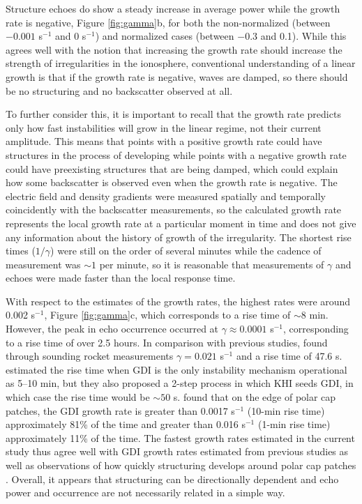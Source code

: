 Structure echoes do show a steady increase in average power while the growth rate is negative, Figure \ref{fig:gamma}b, for both the non-normalized (between \(-0.001\) s\(^{-1}\) and 0  s\(^{-1}\)) and normalized cases (between \(-0.3\) and 0.1).  While this agrees well with the notion that increasing the growth rate should increase the strength of irregularities in the ionosphere, conventional understanding of a linear growth is that if the growth rate is negative, waves are damped, so there should be no structuring and no backscatter observed at all.

To further consider this, it is important to recall that the growth rate predicts only how fast instabilities will grow in the linear regime, not their current amplitude.  This means that points with a positive growth rate could have structures in the process of developing while points with a negative growth rate could have preexisting structures that are being damped, which could explain how some backscatter is observed even when the growth rate is negative.  The electric field and density gradients were measured spatially and temporally coincidently with the backscatter measurements, so the calculated growth rate represents the local growth rate at a particular moment in time and does not give any information about the history of growth of the irregularity.  The shortest rise times (\(1/\gamma\)) were still on the order of several minutes while the cadence of measurement was \(\sim1\) per minute, so it is reasonable that measurements of \(\gamma\) and echoes were made faster than the local response time.

With respect to the estimates of the growth rates, the highest rates were around 0.002 s\(^{-1}\), Figure \ref{fig:gamma}c, which corresponds to a rise time of \(\sim8\) min.  However, the peak in echo occurrence occurred at \(\gamma\approx0.0001\) s\(^{-1}\), corresponding to a rise time of over 2.5 hours. In comparison with previous studies, \citet{Moe12} found through sounding rocket measurements \(\gamma = 0.021\) s\(^{-1}\) and a rise time of 47.6 s.  \citet{Carlson2007} estimated the rise time when GDI is the only instability mechanism operational as 5--10 min, but they also proposed a 2-step process in which KHI seeds GDI, in which case the rise time would be \(\sim50\) s.  \citet{Burston2016} found that on the edge of polar cap patches, the GDI growth rate is greater than 0.0017 s\(^{-1}\) (10-min rise time) approximately 81\% of the time and greater than 0.016 s\(^{-1}\) (1-min rise time) approximately 11\% of the time. The fastest growth rates estimated in the current study thus agree well with GDI growth rates estimated from previous studies as well as observations of how quickly structuring develops around polar cap patches \citep{Carlson2007}.  Overall, it appears that structuring can be directionally dependent and echo power and occurrence are not necessarily related in a simple way.



